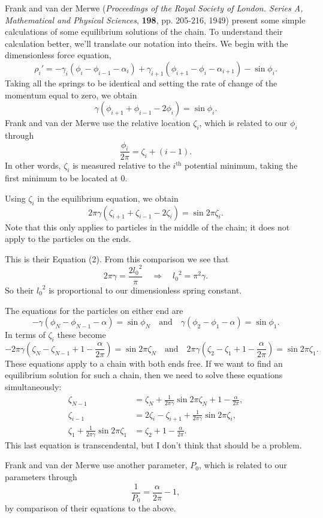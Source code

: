 \documentclass[11pt]{article}
\begin{document}
Frank and van der Merwe (\textit{Proceedings of the Royal Society of London. Series A, Mathematical and Physical Sciences}, \textbf{198}, pp. 205-216, 1949) present some simple calculations of some equilibrium solutions of the chain. To understand their calculation better, we'll translate our notation into theirs. We begin with the dimensionless force equation,
\[
\rho_i'=-\gamma_i(\phi_i-\phi_{i-1}-\alpha_i)
	+\gamma_{i+1}(\phi_{i+1}-\phi_i-\alpha_{i+1})
	-\sin\phi_i.
\]
Taking all the springs to be identical and setting the rate of change of the momentum equal to zero, we obtain
\[
\gamma(\phi_{i+1}+\phi_{i-1}-2\phi_i)=\sin\phi_i.
\]
Frank and van der Merwe use the relative location $\zeta_i$, which is related to our $\phi_i$ through
\[
\frac{\phi_i}{2\pi}=\zeta_i+(i-1).
\]
In other words, $\zeta_i$ is measured relative to the $i^\text{th}$ potential minimum, taking the first minimum to be located at 0.

Using $\zeta_i$ in the equilibrium equation, we obtain
\[
2\pi\gamma(\zeta_{i+1}+\zeta_{i-1}-2\zeta_i)=\sin2\pi\zeta_i.
\]
Note that this only applies to particles in the middle of the chain; it does not apply to the particles on the ends.

This is their Equation (2). From this comparison we see that
\[
2\pi\gamma=\frac{2{l_0}^2}{\pi}\quad\Rightarrow\quad {l_0}^2=\pi^2\gamma.
\]
So their ${l_0}^2$ is proportional to our dimensionless spring constant.

The equations for the particles on either end are
\[
-\gamma(\phi_N-\phi_{N-1}-\alpha)=\sin\phi_N\quad\text{and}\quad
\gamma(\phi_2-\phi_1-\alpha)=\sin\phi_1.
\]
In terms of $\zeta_i$ these become
\[
-2\pi\gamma\left(\zeta_N-\zeta_{N-1}+1-\frac{\alpha}{2\pi}\right)
	=\sin2\pi\zeta_N
\quad\text{and}\quad
2\pi\gamma\left(\zeta_2-\zeta_1+1-\frac{\alpha}{2\pi}\right)
	=\sin2\pi\zeta_1.
\]
These equations apply to a chain with both ends free. If we want to find an equilibrium solution for such a chain, then we need to solve these equations simultaneously:
\begin{align*}
\zeta_{N-1}&=\zeta_N+\frac{1}{2\pi\gamma}\sin2\pi\zeta_N+1
	-\frac{\alpha}{2\pi},\\
\zeta_{i-1}&=2\zeta_i-\zeta_{i+1}+\frac{1}{2\pi\gamma}\sin2\pi\zeta_i,\\
\zeta_1+\frac{1}{2\pi\gamma}\sin2\pi\zeta_1&=\zeta_2+1
	-\frac{\alpha}{2\pi}.
\end{align*}
This last equation is transcendental, but I don't think that should be a problem.

Frank and van der Merwe use another parameter, $P_0$, which is related to our parameters through
\[
\frac{1}{P_0}=\frac{\alpha}{2\pi}-1,
\]
by comparison of their equations to the above.
\end{document}

